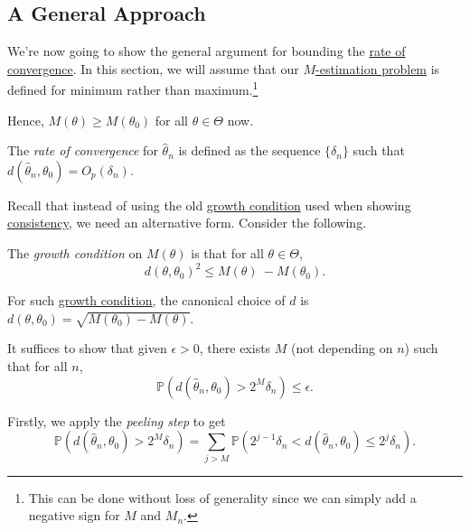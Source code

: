 \subsection{A General Approach}
We're now going to show the general argument for bounding the \hyperref[def:rate-of-convergence]{rate of convergence}. In this section, we will assume that our \hyperref[prb:M-estimation]{\(M\)-estimation problem} is defined for minimum rather than maximum.\footnote{This can be done without loss of generality since we can simply add a negative sign for \(M\) and \(M_n\).}

\begin{note}
	Hence, \(M(\theta ) \geq M(\theta _0)\) for all \(\theta \in \Theta \) now.
\end{note}

\begin{definition}\label{def:rate-of-convergence}
	The \emph{rate of convergence} for \(\hat{\theta} _n\) is defined as the sequence \(\{ \delta _n \} \) such that \(d(\hat{\theta} _n, \theta _0) = O_p(\delta _n)\).
\end{definition}

Recall that instead of using the old \hyperref[def:growth-condition]{growth condition} used when showing \hyperref[def:consistent]{consistency}, we need an alternative form. Consider the following.

\begin{definition}\label{def:growth-condition*}
	The \emph{growth condition} on \(M(\theta )\) is that for all \(\theta \in \Theta \),
	\[
		d(\theta , \theta _0)^2 \leq M(\theta )\ - M(\theta _0).
	\]
\end{definition}

\begin{note}
	For such \hyperref[def:growth-condition*]{growth condition}, the canonical choice of \(d\) is \(d(\theta , \theta _0) = \sqrt{M(\theta _0) - M(\theta )}\).
\end{note}

It suffices to show that given \(\epsilon > 0\), there exists \(M\) (not depending on \(n\)) such that for all \(n\),
\[
	\mathbb{P} (d(\hat{\theta} _n, \theta _0) > 2^M \delta _n) \leq \epsilon.
\]

Firstly, we apply the \emph{peeling step} to get
\begin{equation}\label{eq:peeling-step}
	\mathbb{P} (d(\hat{\theta} _n, \theta _0) > 2^M \delta _n)
	= \sum_{j > M} \mathbb{P} (2^{j-1} \delta _n < d(\hat{\theta} _n, \theta _0) \leq 2^j \delta _n).
\end{equation}

